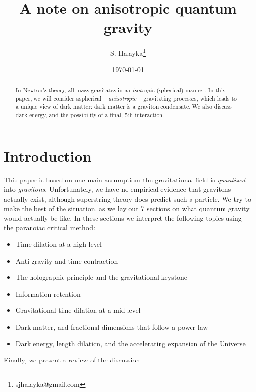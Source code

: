 \documentclass[12pt]{article}
\title{A note on anisotropic quantum gravity}
\author{S. Halayka\footnote{sjhalayka@gmail.com}}
\date{\today\;\currenttime}
\begin{document}
 
\maketitle

\begin{abstract}
In Newton's theory, all mass gravitates in an {\textit{isotropic}} (spherical) manner.
In this paper, we will consider aspherical -- {\textit{anisotropic}} -- gravitating processes, which leads to a unique view of dark matter: dark matter is a graviton condensate.
We also discuss dark energy, and the possibility of a final, $5$th interaction.
\end{abstract}





\section{Introduction}

This paper is based on one main assumption: the gravitational field is {\textit{quantized}} into {\textit{gravitons}}.
Unfortunately, we have no empirical evidence that gravitons actually exist, although superstring theory \cite{wray} does predict such a particle.
We try to make the best of the situation, as we lay out 7 sections on what quantum gravity would actually be like.
In these sections we interpret the following topics using the paranoiac critical method:
\begin{itemize}
\item Time dilation at a high level
\item Anti-gravity and time contraction
\item The holographic principle and the gravitational keystone
\item Information retention
\item Gravitational time dilation at a mid level
\item Dark matter, and fractional dimensions that follow a power law
\item Dark energy, length dilation, and the accelerating expansion of the Universe
\end{itemize}

Finally, we present a review of the discussion.

\end{document}
